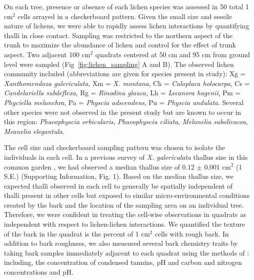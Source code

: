 \documentclass[fleqn,12pt]{olplainarticle}
\begin{document}
On each tree, presence or absence of each lichen species was assessed
in 50 total 1 cm$^2$ cells arrayed in a checkerboard pattern. Given
the small size and sessile nature of lichens, we were able to rapidly
assess lichen interactions by quantifying thalli in close
contact. Sampling was restricted to the northern aspect of the trunk
to maximize the abundance of lichen and control for the effect of
trunk aspect. Two adjacent 100 cm$^2$ quadrats centered at 50 cm and
95 cm from ground level were sampled (Fig~\ref{fig:lichen_sampling} A
and B). The observed lichen community included (abbreviations are
given for species present in study): Xg = \textit{Xanthomendoza
  galericulata}, Xm = \textit{X. montana}, Ch = \textit{Caloplaca
  holocarpa}, Cs = \textit{Candelariella subdeflexa}, Rg =
\textit{Rinodina glauca}, Lh = \textit{Lecanora hagenii}, Pm =
\textit{Phyciella melanchra}, Pa = \textit{Physcia adscendens}, Pu =
\textit{Physcia undulata}. Several other species were not observed in
the present study but are known to occur in this region:
\textit{Phaeophyscia orbicularis}, \textit{Phaeophyscia ciliata},
\textit{Melanelia subolivacea}, \textit{Meanelia elegantula}.


The cell size and checkerboard sampling pattern was chosen to isolate
the individuals in each cell. In a previous survey of
\textit{X. galericulata} thallus size in this common garden
\citep{Lamit2015a}, we had observed a median thallus size of 0.12
$\pm$ 0.001 cm$^2$ (1 S.E.)  (Supporting Information, Fig. 1). Based
on the median thallus size, we expected thalli observed in each cell
to generally be spatially independent of thalli present in other cells
but exposed to similar micro-environmental conditions created by the
bark and the location of the sampling area on an individual
tree. Therefore, we were confident in treating the cell-wise
observations in quadrats as independent with respect to lichen-lichen
interactions. We quantified the texture of the bark in the quadrat is
the percent of 1 cm$^2$ cells with rough bark. In addition to bark
roughness, we also measured several bark chemistry traits by taking
bark samples immediately adjacent to each quadrat using the methods of
\cite{Lamit2011}: including, the concentration of condensed tannins,
pH and carbon and nitrogen concentrations and pH.
\end{document}
